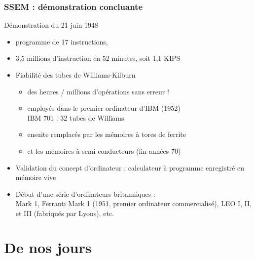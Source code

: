 \begin{frame}
\frametitle{SSEM : démonstration concluante}

\begin{block}{Démonstration du 21 juin 1948}
\begin{itemize}
\item programme de 17 instructions,
\item 3,5 millions d'instruction en 52 minutes, soit 1,1 KIPS
\end{itemize}
\end{block}


\begin{itemize}
\item Fiabilité des tubes de Williams-Kilburn
  \begin{itemize}
  \item des heures / millions d'opérations sans erreur !
  \item employés dans le premier ordinateur d'IBM (1952)
    \\ IBM 701 : 32 tubes de Williams
    \item ensuite remplacés par les \alert{mémoires à tores de ferrite}
\item et les \alert{mémoires à semi-conducteurs} (fin années 70)
  \end{itemize}
\item \alert{Validation du concept d'ordinateur} : calculateur à programme 
  enregistré en mémoire vive 
\item Début d'une série d'ordinateurs britanniques : \\
  Mark 1, Ferranti
  Mark 1 (1951, premier ordinateur commercialisé), LEO I, II, et III (fabriqués par Lyons), etc.
\end{itemize}
\end{frame}







\section{De nos jours}

